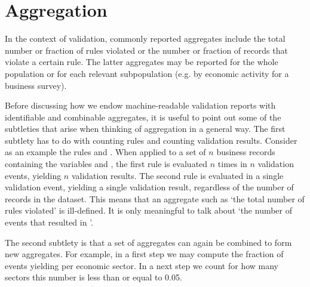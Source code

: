 \section{Aggregation}
In the context of validation, commonly reported aggregates include the total
number or fraction of rules violated or the number or fraction of records  that
violate a certain rule. The latter aggregates may be reported for the whole
population or for each relevant subpopulation (e.g. by economic activity for a
business survey). 


Before discussing how we endow machine-readable validation reports with
identifiable and combinable aggregates, it is useful to point out some of the
subtleties that arise when thinking of aggregation in a general way. The first
subtlety has to do with counting rules and counting validation results.
Consider as an example the rules  and .  When applied to a set of $n$ business records containing the variables
 and , the first rule is evaluated $n$ times in $n$
validation events, yielding $n$ validation results. The second rule is
evaluated in a single validation event, yielding a single validation result,
regardless of the number of records in the dataset. This means that an
aggregate such as `the total number of rules violated' is ill-defined. It is
only meaningful to talk about `the number of events that resulted in
\onwaar{}'. 

The second subtlety is that a set of aggregates can again be combined to form
new aggregates. For example, in a first step we may compute the fraction of
events yielding \onwaar{} per economic sector. In a next step we count for how
many sectors this number is less than or equal to 0.05.

